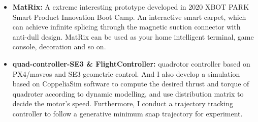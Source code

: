 \documentclass[11pt,a4paper,sans]{moderncv}        %
\begin{document}
{\begin{itemize}
\textbf{Jianheng Liu}, Yunfan Ren, Haoyao Chen and Yunhui Liu. \textbf{IROS, 2021}

A novel real-time system for estimating the payload position; the system consists of a monocular fisheye camera and a encoder-based device. A Gaussian fusion-based estimation algorithm is developed to obtain the payload state estimation. Based on the robust payload position estimation, a payload controller is presented to ensure the reliable tracking performance on aggressive trajectories.

\vspace{6pt}

\item \textbf{MatRix:} A extreme interesting prototype developed in 2020 XBOT PARK Smart Product Innovation Boot Camp. An interactive smart carpet, which can achieve infinite splicing through the magnetic suction connector with anti-dull design. MatRix can be used as your home intelligent terminal, game console, decoration and so on.


\vspace{6pt}

\item \textbf{quad-controller-SE3 \& FlightController:} quadrotor controller based on PX4/mavros and SE3 geometric control. And I also develop a simulation based on CoppeliaSim software to compute the desired thrust and torque of quadroter according to dynamic modelling, and use distribution matrix to decide the motor's speed. Furthermore, I conduct a trajectory tracking controller to follow a generative minimum snap trajectory for experiment.



\end{itemize}}
\end{document}
